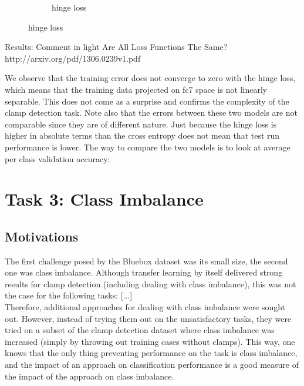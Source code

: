 \documentclass[a4paper,11pt]{article}
\begin{document}
\begin{figure}
\begin{minipage}[b]{\textwidth}
\begin{subfigure}{.5\textwidth}
        \caption{hinge loss}\label{fig:2b}
      \end{subfigure} \par \vspace*{20pt} %
      \caption{hinge loss}\label{fig:2}
    \end{minipage}%
\end{figure}

Results:
Comment in light Are All Loss Functions The Same? http://arxiv.org/pdf/1306.0239v1.pdf

We observe that the training error does not converge to zero with the hinge loss, which means that the training data projected on fc7 space is not linearly separable. This does not come as a surprise and confirms the complexity of the clamp detection task. Note also that the errors between these two models are not comparable since they are of different nature. Just because the hinge loss is higher in absolute terms than the cross entropy does not mean that test run performance is lower. The way to compare the two models is to look at average per class validation accuracy: \\

\clearpage
\section{Task 3: Class Imbalance}

\subsection{Motivations}

The first challenge posed by the Bluebox dataset was its small size, the second one was class imbalance. Although transfer learning by itself delivered strong results for clamp detection (including dealing with class imbalance), this was not the case for the following tasks: [...] \\

Therefore, additional approaches for dealing with class imbalance were sought out. However, instead of trying them out on the unsatisfactory tasks, they were tried on a subset of the clamp detection dataset where class imbalance was increased (simply by throwing out training cases without clamps). This way, one knows that the only thing preventing performance on the task is class imbalance, and the impact of an approach on classification performance is a good measure of the impact of the approach on class imbalance. \\
\end{document}

